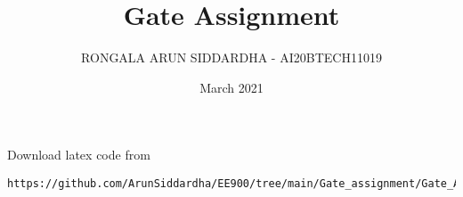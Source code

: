 \documentclass[journal,12pt,twocolumn]{IEEEtran}
\date{March 2021}
\DeclareMathOperator*{\Res}{Res}
\begin{document}
\newcommand{\BEQA}{\begin{eqnarray}}
\newcommand{\EEQA}{\end{eqnarray}}
\newcommand{\define}{\stackrel{\triangle}{=}}

\raggedbottom
\setlength{\parindent}{0pt}
\providecommand{\mbf}{\mathbf}
\providecommand{\pr}[1]{\ensuremath{\Pr\left(#1\right)}}
\providecommand{\qfunc}[1]{\ensuremath{Q\left(#1\right)}}
\providecommand{\fn}[1]{\ensuremath{f\left(#1\right)}}
\providecommand{\e}[1]{\ensuremath{E\left(#1\right)}}
\providecommand{\sbrak}[1]{\ensuremath{{}\left[#1\right]}}
\providecommand{\lsbrak}[1]{\ensuremath{{}\left[#1\right.}}
\providecommand{\rsbrak}[1]{\ensuremath{{}\left.#1\right]}}
\providecommand{\brak}[1]{\ensuremath{\left(#1\right)}}
\providecommand{\lbrak}[1]{\ensuremath{\left(#1\right.}}
\providecommand{\rbrak}[1]{\ensuremath{\left.#1\right)}}
\providecommand{\cbrak}[1]{\ensuremath{\left\{#1\right\}}}
\providecommand{\lcbrak}[1]{\ensuremath{\left\{#1\right.}}
\providecommand{\rcbrak}[1]{\ensuremath{\left.#1\right\}}}
\theoremstyle{remark}
\newtheorem{rem}{Remark}
\newcommand{\sgn}{\mathop{\mathrm{sgn}}}
\providecommand{\abs}[1]{\vert#1\vert}
\providecommand{\res}[1]{\Res\displaylimits_{#1}} 
\providecommand{\norm}[1]{\lVert#1\rVert}
\providecommand{\mtx}[1]{\mathbf{#1}}
\providecommand{\mean}[1]{E[ #1 ]}
\providecommand{\fourier}{\overset{\mathcal{F}}{ \rightleftharpoons}}
\providecommand{\system}{\overset{\mathcal{H}}{ \longleftrightarrow}}
\newcommand{\solution}{\noindent \textbf{Solution: }}
\newcommand{\cosec}{\,\text{cosec}\,}
\providecommand{\dec}[2]{\ensuremath{\overset{#1}{\underset{#2}{\gtrless}}}}
\newcommand{\myvec}[1]{\ensuremath{\begin{pmatrix}#1\end{pmatrix}}}
\newcommand{\mydet}[1]{\ensuremath{\begin{vmatrix}#1\end{vmatrix}}}
\makeatletter
\vspace{3cm}
\title{Gate Assignment}
\author{RONGALA ARUN SIDDARDHA - AI20BTECH11019}
\maketitle
\newpage
\bigskip
\renewcommand{\thetable}{\theenumi}

%
Download latex code from 
%
\begin{lstlisting}
https://github.com/ArunSiddardha/EE900/tree/main/Gate_assignment/Gate_Assignment.tex
\end{lstlisting}
\end{document}

